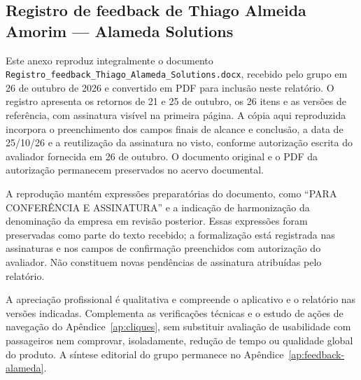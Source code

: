 \documentclass[12pt,oneside,a4paper,brazil,chapter=TITLE]{abntex2}
\begin{document}
\begin{anexosenv}
\chapter{Registro de feedback de Thiago Almeida Amorim — Alameda Solutions}\label{an:parecer-thiago}
Este anexo reproduz integralmente o documento \nolinkurl{Registro_feedback_Thiago_Alameda_Solutions.docx}, recebido pelo grupo em 26 de outubro de 2026 e convertido em PDF para inclusão neste relatório. O registro apresenta os retornos de 21 e 25 de outubro, os 26 itens e as versões de referência, com assinatura visível na primeira página. A cópia aqui reproduzida incorpora o preenchimento dos campos finais de alcance e conclusão, a data de 25/10/26 e a reutilização da assinatura no visto, conforme autorização escrita do avaliador fornecida em 26 de outubro. O documento original e o PDF da autorização permanecem preservados no acervo documental.

A reprodução mantém expressões preparatórias do documento, como “PARA CONFERÊNCIA E ASSINATURA” e a indicação de harmonização da denominação da empresa em revisão posterior. Essas expressões foram preservadas como parte do texto recebido; a formalização está registrada nas assinaturas e nos campos de confirmação preenchidos com autorização do avaliador. Não constituem novas pendências de assinatura atribuídas pelo relatório.

A apreciação profissional é qualitativa e compreende o aplicativo e o relatório nas versões indicadas. Complementa as verificações técnicas e o estudo de ações de navegação do Apêndice~\ref{ap:cliques}, sem substituir avaliação de usabilidade com passageiros nem comprovar, isoladamente, redução de tempo ou qualidade global do produto. A síntese editorial do grupo permanece no Apêndice~\ref{ap:feedback-alameda}.

\end{anexosenv}
\end{document}
